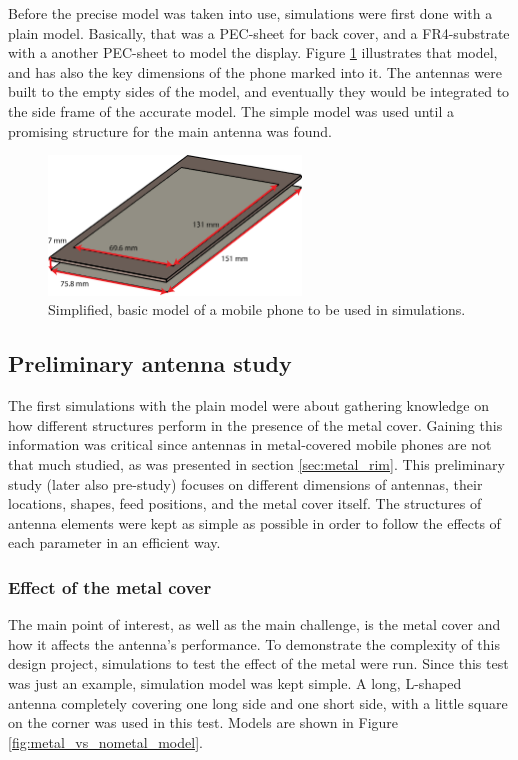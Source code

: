 Before the precise model was taken into use, simulations were first done with a plain model. Basically, that was a PEC-sheet for back cover, and a FR4-substrate with a another PEC-sheet to model the display. Figure \ref{fig:basic_structure} illustrates that model, and has also the key dimensions of the phone marked into it. The antennas were built to the empty sides of the model, and eventually they would be integrated to the side frame of the accurate model. The simple model was used until a promising structure for the main antenna was found. 
\begin{figure}[H]
    \centering
    \includegraphics[width=0.6\textwidth]{img/basic_structure.eps}
    \caption{Simplified, basic model of a mobile phone to be used in simulations.}
    \label{fig:basic_structure}
\end{figure}

\subsection{Preliminary antenna study}
\label{sec:pre_study}
The first simulations with the plain model were about gathering knowledge on how different structures perform in the presence of the metal cover. Gaining this information was critical since antennas in metal-covered mobile phones are not that much studied, as was presented in section \ref{sec:metal_rim}. This preliminary study (later also pre-study) focuses on different dimensions of antennas, their locations, shapes, feed positions, and the metal cover itself. The structures of antenna elements were kept as simple as possible in order to follow the effects of each parameter in an efficient way. 


\subsubsection{Effect of the metal cover}
\label{sec:metal_effect}
The main point of interest, as well as the main challenge, is the metal cover and how it affects the antenna's performance. To demonstrate the complexity of this design project, simulations to test the effect of the metal were run. Since this test was just an example, simulation model was kept simple. A long, L-shaped antenna completely covering one long side and one short side, with a little square on the corner was used in this test. Models are shown in Figure \ref{fig:metal_vs_nometal_model}.

